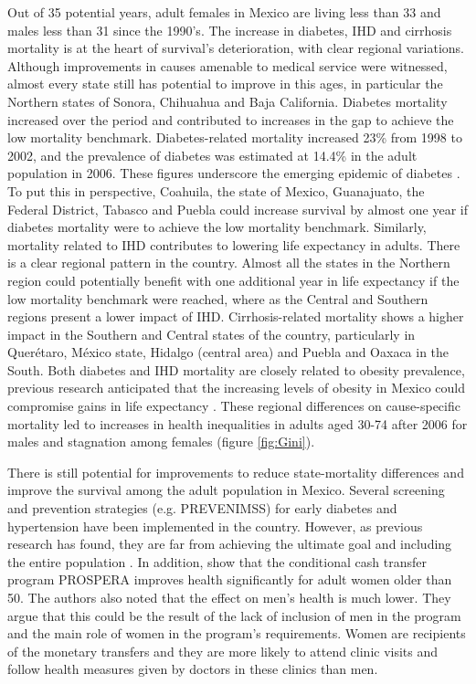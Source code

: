\documentclass{bmcart}
\begin{document}
Out of 35 potential years, adult females in Mexico are living less than 33 and males less than 31 since the 1990's. The increase in  diabetes, IHD and cirrhosis mortality is at the heart of survival's deterioration, with clear regional variations. Although improvements in causes amenable to medical service were witnessed, almost every state still has potential to improve in this ages, in particular the Northern states of Sonora, Chihuahua and Baja California. Diabetes mortality increased over the period and contributed to increases in the gap to achieve the low mortality benchmark. Diabetes-related mortality increased 23\% from 1998 to 2002, and the prevalence of diabetes was estimated at 14.4\% in the adult population in 2006. These figures underscore the emerging epidemic of diabetes \cite{glassman2010confronting}. To put this in perspective, Coahuila, the state of Mexico, Guanajuato, the Federal District, Tabasco and Puebla could increase survival by almost one year if diabetes mortality were to achieve the low mortality benchmark. Similarly, mortality related to IHD contributes to lowering life expectancy in adults. There is a clear regional pattern in the country. Almost all the states in the Northern region could potentially benefit with one additional year in life expectancy if the low mortality benchmark were reached, where as the Central and Southern regions present a lower impact of IHD. Cirrhosis-related mortality shows a higher impact in the Southern and Central states of the country, particularly in Quer\'etaro, M\'exico state, Hidalgo (central area) and Puebla and Oaxaca in the South. Both diabetes and IHD mortality are closely related to obesity prevalence, previous research anticipated that the increasing levels of obesity in Mexico could compromise gains in life expectancy \cite{monteverde2010obesity}. These regional differences on cause-specific mortality led to increases in health inequalities in adults aged 30-74 after 2006 for males and stagnation among females (figure \ref{fig:Gini}). 


There is still potential for improvements to reduce state-mortality differences and improve the survival among the adult population in Mexico. Several screening and prevention strategies (e.g. PREVENIMSS) for early diabetes and hypertension have been implemented in the country. However, as previous research has found, they are far from achieving the ultimate goal and including the entire population \cite{castro2010potential}. In addition, \cite{behrman2013health} show that the conditional cash transfer program PROSPERA improves health significantly for adult women older than 50. The authors also noted that the effect on men's health is much lower. They argue that this could be the result of the lack of inclusion of men in the program and the main role of women in the program's requirements. Women are recipients of the monetary transfers and they are more likely to attend clinic visits and follow health measures given by doctors in these clinics than men.\\
\end{document}

